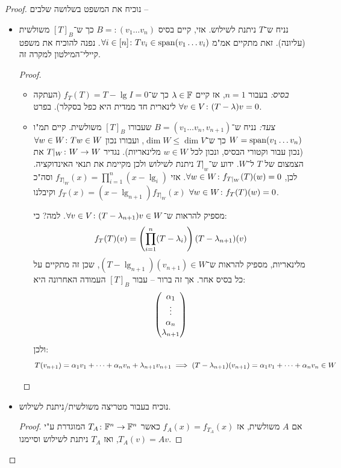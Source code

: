 \documentclass[]{../../../../tex/classes/styledArticle}
\begin{document}
	\section{}
	\begin{proof}
		נוכיח את המשפט בשלושה שלבים – 
	\begin{itemize}
		\item נניח ש־$T$ ניתנת לשילוש. אזי, קיים בסיס $B =: (v_1 \dots v_n)$ כך ש־$[T]_B$ משולשית (עליונה). זאת מתקיים אמ"מ $\forall i \in [n] \colon Tv_i \in \operatorname{span}(v_1 \dots v_i)$. נפנה להוכיח את משפט קיילי־המילטון למקרה זה. 
		
		\begin{proof}
			\begin{itemize}
				\item \textit{בסיס:} בעבור $n = 1$, אז קיים $\lambda \in \mathbb{F}$ כך ש־$f_T(T) = T - \lg I = 0$ (העתקה לינארית חד ממדית היא כפל בסקלר). בפרט $\forall v \in V \colon (T - \lambda)v = 0$. 
				\item \textit{צעד:} נניח ש־$B = (v_1 \dots v_n, v_{n + 1})$ שעבורו $[T]_B$ משולשית. קיים תמ"ו $W = \operatorname{span}(v_1 \dots v_n)$ כך ש־$\dim W \le \dim V$, ועבורו נכון $\forall w \in W \colon Tw \in W$ (נכון עבור וקטורי הבסיס, ונכון לכל $w \in W$ מלינאריות). נגדיר $T|_W \colon W \to W$ את הצמצום של $T$ ל־$W$. ידוע ש־$T|_w$ ניתנת לשילוש ולכן מקיימת את תנאי האינדוקציה. לכן, $\forall w \in W\colon f_{T|_W}(T)(w) = 0$. אזי $f_{T|_W}(x) = \prod_{i = 1}^{n}(x - \lg_i)$ וסה"כ $f_{T}(x) = (x - \lg_{n + 1})f_{T|_W}(x)$ וקיבלנו $\forall w \in W \colon f_T(T)(w) = 0$. 
				
				מספיק להראות ש־$\forall v \in V \colon (T - \lambda_{n + 1})v \in W$. למה? כי: 
				\[ f_T(T)(v) = \left ( \prod_{i = 1}^{n}(T - \lambda_i) \right )(T - \lambda_{n + 1})(v) \]
				מלינאריות, מספיק להראות ש־$(T - \lg_{n + 1})(v_{n + 1})\in W$, שכן זה מתקיים על כל בסיס אחר. אך זה ברור – עבור $[T]_B$ העמודה האחרונה היא: 
				\[ \begin{pmatrix} \alpha_1 \\ \vdots \\ \alpha_n \\ \lambda_{n +1} \end{pmatrix} \]
				ולכן: 
				\[ T(v_{n + 1}) = \alpha_1 v_1 + \cdots + \alpha_n v_n + \lambda_{n + 1} v_{n + 1} \implies (T - \lambda_{n + 1})(v_{n + 1}) = \alpha_1v_1 + \cdots + \alpha_n v_n \in W \]
			\end{itemize}
		\end{proof}
		\item נוכיח בעבור מטריצה משולשית/ניתנת לשילוש. \begin{proof}
			אם $A$ משולשית, אז $f_A(x) = f_{T_A}(x)$ כאשר $T_A \colon \mathbb{F}^n \to \mathbb{F}^n$ המוגדרת ע"י $T_A(v) = Av$, ואז $T_A$ ניתנת לשילוש וסיימנו. 
			

\end{proof}
\end{itemize}
\end{proof}
\end{document}
